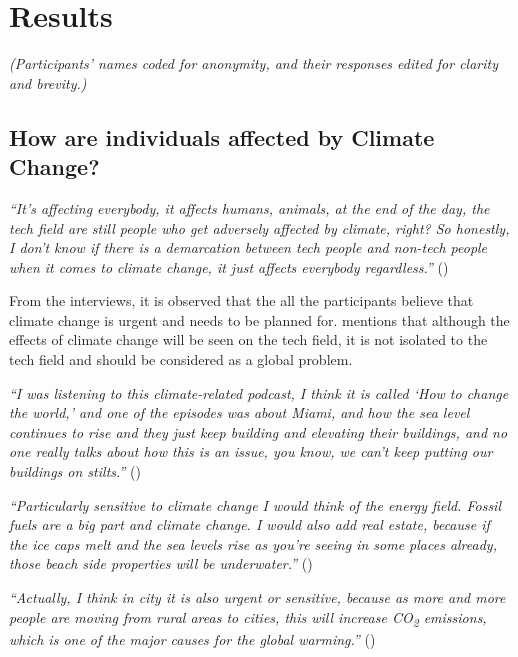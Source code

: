 \section{Results}

\emph{(Participants' names coded for anonymity, and their responses edited for clarity and brevity.)}

    \subsection{How are individuals affected by Climate Change?}
    
    \begin{quoting}
        \textit{``It's affecting everybody, it affects humans, animals, at the end of the day, the tech field are still people who get adversely affected by climate, right? So honestly, I don't know if there is a demarcation between tech people and non-tech people when it comes to climate change, it just affects everybody regardless.''} ()
    \end{quoting}

    From the interviews, it is observed that the all the participants believe that climate change is urgent and needs to be planned for.  mentions that although the effects of climate change will be seen on the tech field, it is not isolated to the tech field and should be considered as a global problem.
    
    \begin{quoting}
        \textit{``I was listening to this climate-related podcast, I think it is called `How to change the world,' and one of the episodes was about Miami, and how the sea level continues to rise and they just keep building and elevating their buildings, and no one really talks about how this is an issue, you know, we can't keep putting our buildings on stilts.''} ()
    \end{quoting}
    
    \begin{quoting}
        \textit{``Particularly sensitive to climate change I would think of the energy field. Fossil fuels are a big part and climate change. I would also add real estate, because if the ice caps melt and the sea levels rise as you're seeing in some places already, those beach side properties will be underwater.''} ()
    \end{quoting}

    \begin{quoting}
        \textit{``Actually, I think in city it is also urgent or sensitive, because as more and more people are moving from rural areas to cities, this will increase CO\textsubscript{2} emissions, which is one of the major causes for the global warming.''} ()
    \end{quoting}
    
